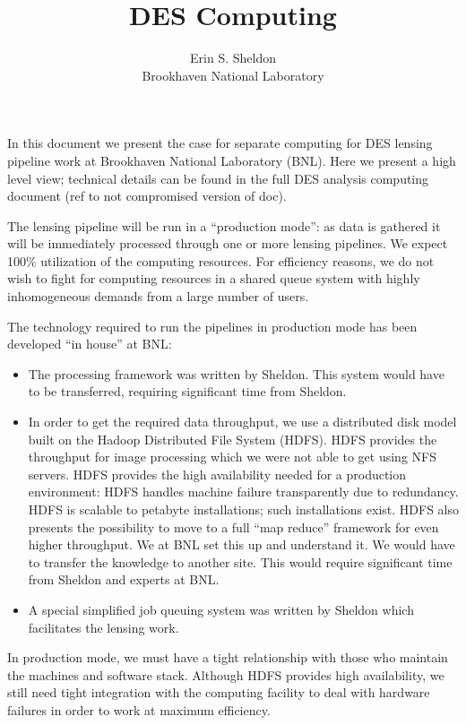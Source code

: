 \documentclass[12pt]{article}
\title{DES Computing}
\author{Erin S. Sheldon\\
Brookhaven National Laboratory}
\date{}
\begin{document}
\maketitle


In this document we present the case for separate computing for DES lensing
pipeline work at Brookhaven National Laboratory (BNL).  Here we present a high
level view; technical details can be found in the full DES analysis computing
document (ref to not compromised version of doc).

The lensing pipeline will be run in a ``production mode'': as data is gathered it
will be immediately processed through one or more lensing pipelines.  We expect
100\% utilization of the computing resources.  For efficiency reasons, we do
not wish to fight for computing resources in a shared queue system with highly
inhomogeneous demands from a large number of users.

The technology required to run the pipelines in production mode has been
developed ``in house'' at BNL:  
\begin{itemize}

    \item The processing framework was written by Sheldon. This system would
    have to be transferred, requiring significant time from Sheldon.

    \item In order to get the required data throughput, we use a distributed
    disk model built on the Hadoop Distributed File System (HDFS).  HDFS
    provides the throughput for image processing which we were not able to get
    using NFS servers. HDFS provides the high availability needed for a
    production environment: HDFS handles machine failure transparently due to
    redundancy.  HDFS is scalable to petabyte installations; such installations
    exist.  HDFS also presents the possibility to move to a full ``map reduce''
    framework for even higher throughput.  We at BNL set this up and understand
    it. We would have to transfer the knowledge to another site.  This would
    require significant time from Sheldon and experts at BNL.
    
    \item A special simplified job queuing system was written by Sheldon which
    facilitates the lensing work.

\end{itemize}

In production mode, we must have a tight relationship with those who maintain
the machines and software stack.  Although HDFS provides high availability, we
still need tight integration with the computing facility to deal with hardware
failures in order to work at maximum efficiency.  
\end{document}
